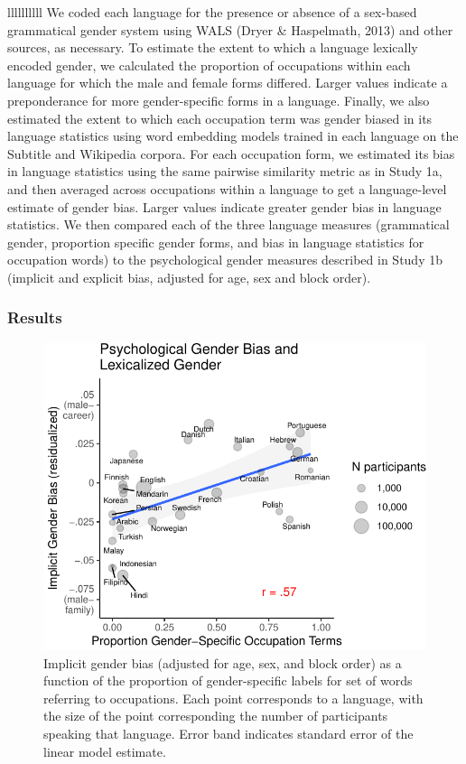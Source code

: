 \documentclass[9pt,twocolumn,twoside,lineno]{pnas-new}
\begin{document}
\begin{table}{llllllllll}
We coded each language for the presence or absence of a sex-based
grammatical gender system using WALS (Dryer \& Haspelmath, 2013) and
other sources, as necessary. To estimate the extent to which a language
lexically encoded gender, we calculated the proportion of occupations
within each language for which the male and female forms differed.
Larger values indicate a preponderance for more gender-specific forms in
a language. Finally, we also estimated the extent to which each
occupation term was gender biased in its language statistics using word
embedding models trained in each language on the Subtitle and Wikipedia
corpora. For each occupation form, we estimated its bias in language
statistics using the same pairwise similarity metric as in Study 1a, and
then averaged across occupations within a language to get a
language-level estimate of gender bias. Larger values indicate greater
gender bias in language statistics. We then compared each of the three
language measures (grammatical gender, proportion specific gender forms,
and bias in language statistics for occupation words) to the
psychological gender measures described in Study 1b (implicit and
explicit bias, adjusted for age, sex and block order).

\subsubsection*{Results}\label{results-4}

\begin{figure}
\centering
\includegraphics[width=.8\linewidth]{iat_lang_files/figure-latex/unnamed-chunk-14-1.pdf}
\caption{\label{fig:unnamed-chunk-14}Implicit gender bias (adjusted for age,
sex, and block order) as a function of the proportion of gender-specific
labels for set of words referring to occupations. Each point corresponds
to a language, with the size of the point corresponding the number of
participants speaking that language. Error band indicates standard error
of the linear model estimate.}
\end{figure}


\end{table}
\end{document}
